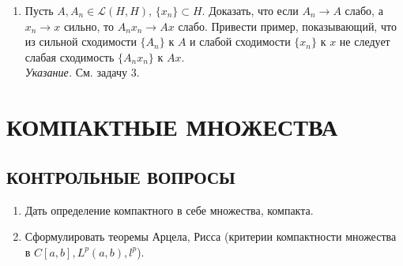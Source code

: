\documentclass[12pt,a4paper]{article}
\begin{document}
\begin{enumerate}
\item Пусть $A, A_{n} \in \mathcal{L}(H,H)$, $\{x_{n}\} \subset H$. Доказать, что если $A_{n} \rightarrow A$ слабо, а $x_{n} \rightarrow x$ сильно, то $A_{n}x_{n} \rightarrow Ax$ слабо. Привести пример, показывающий, что из сильной сходимости $\{A_{n}\}$ к $A$ и слабой сходимости $\{x_{n}\}$ к $x$ не следует слабая сходимость $\{A_{n}x_{n}\}$ к $Ax$.\\
\textit{Указание.} См. задачу 3.
\end{enumerate}

\section{КОМПАКТНЫЕ МНОЖЕСТВА}

\subsection*{КОНТРОЛЬНЫЕ ВОПРОСЫ}
\begin{enumerate}
\item Дать определение компактного в себе множества, компакта.
\item Сформулировать теоремы Арцела, Рисса (критерии компактности множества в $C[a,b], L^{p}(a,b), l^{p}$).
\end{enumerate}
\end{document}
